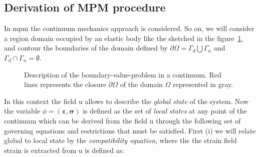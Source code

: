 \documentclass[preprint,12pt,a4paper]{elsarticle}
\newcommand{\tens}[1]{
  \ensuremath{\mathbf{{#1}}}
}
\begin{document}
\subsection{Derivation of MPM procedure}
\label{sec:derivation-mpm}

In \acrshort{mpm} the continuum mechanics approach is considered. So on, we will consider a region \gls{domain} occupied by an elastic body like
the sketched in the figure~\ref{fig:Continuum-solid}, and \gls{contour} the boundaries of the domain defined by $\partial \varOmega
= \Gamma_d \bigcup \Gamma_n$ and $\Gamma_d \cap  \Gamma_n = \emptyset$.
\begin{figure}\sidecaption
  \centering
  \caption{Description of the boundary-value-problem in a
    continuum. Red lines represents the closure $\partial \varOmega$
    of the domain $\varOmega$ represented in gray.}
  \label{fig:Continuum-solid}
\end{figure}
In this context the field \gls{u} allows to describe the \textit{global state}
of the system. Now the variable $\phi =
(\tens{\varepsilon},\tens{\sigma})$ is defined as the set of \textit{local
  states} at any point of the continuum which can be derived from the
field \gls{u} through the following set of governing equations and
restrictions that must be satisfied. First (i) we will relate
  global to local state by the \textit{compatibility equation}, where the the strain field \gls{strain} is extracted from \gls{u} is defined as:
\end{document}
